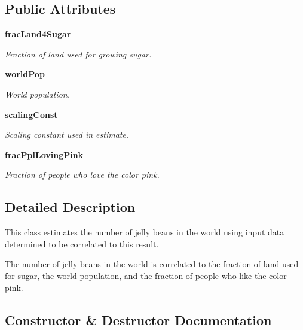 \subsection*{Public Attributes}
\begin{DoxyCompactItemize}
\item 
{\bf frac\+Land4\+Sugar}\label{class_est_num_jellies_1_1_num_jelly_estimator_a9718c54b9d7b610eb5789852daff3661}

\begin{DoxyCompactList}\small\item\em Fraction of land used for growing sugar. \end{DoxyCompactList}\item 
{\bf world\+Pop}\label{class_est_num_jellies_1_1_num_jelly_estimator_afcc81dee96f41bbac3b8a798bcc9a525}

\begin{DoxyCompactList}\small\item\em World population. \end{DoxyCompactList}\item 
{\bf scaling\+Const}\label{class_est_num_jellies_1_1_num_jelly_estimator_a4eef3f82cd4820f723b878333c21f9ce}

\begin{DoxyCompactList}\small\item\em Scaling constant used in estimate. \end{DoxyCompactList}\item 
{\bf frac\+Ppl\+Loving\+Pink}
\begin{DoxyCompactList}\small\item\em Fraction of people who love the color pink. \end{DoxyCompactList}\end{DoxyCompactItemize}


\subsection{Detailed Description}
This class estimates the number of jelly beans in the world using input data determined to be correlated to this result. 

The number of jelly beans in the world is correlated to the fraction of land used for sugar, the world population, and the fraction of people who like the color pink. 

\subsection{Constructor \& Destructor Documentation}
